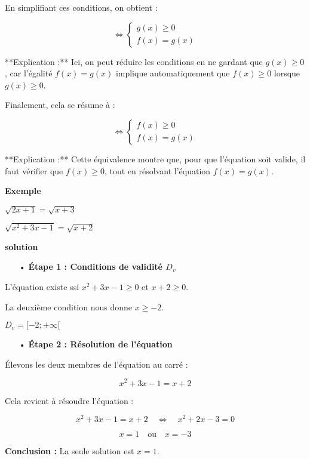 \documentclass[12pt]{article}
\begin{document}
En simplifiant ces conditions, on obtient :

\[
\Leftrightarrow \begin{cases}
g(x) \geq 0 \\
f(x) = g(x)
\end{cases}
\]

**Explication :** Ici, on peut réduire les conditions en ne gardant que \( g(x) \geq 0 \), car l'égalité \( f(x) = g(x) \) implique automatiquement que \( f(x) \geq 0 \) lorsque \( g(x) \geq 0 \).

Finalement, cela se résume à :

\[
\Leftrightarrow \begin{cases}
f(x) \geq 0 \\
f(x) = g(x)
\end{cases}
\]

**Explication :** Cette équivalence montre que, pour que l'équation soit valide, il faut vérifier que \( f(x) \geq 0 \), tout en résolvant l'équation \( f(x) = g(x) \).

 \textbf{Exemple} 
 
\( \sqrt{ 2x+1} = \sqrt{ x+3}  \)

\( \sqrt{ x^{2}+3x-1} = \sqrt{ x+2}  \)

 \textbf{solution} 

\begin{itemize}
    \item[•] \textbf{Étape 1 : Conditions de validité \( D_{v} \)}
\end{itemize}

L'équation existe ssi \( x^2 + 3x - 1 \geq 0 \) et \( x + 2 \geq 0 \). 

 La deuxième condition nous donne \( x \geq -2 \).

\( D_{v} =[-2; +\infty[ \)

\begin{itemize}
    \item[•] \textbf{Étape 2 : Résolution de l'équation}
\end{itemize}

Élevons les deux membres de l'équation au carré :

\[
x^2 + 3x - 1 = x + 2
\]

Cela revient à résoudre l'équation :

\[
x^2 + 3x - 1 = x + 2 \quad \Leftrightarrow \quad x^2 + 2x - 3 = 0
\]


\[
 x = 1 \quad \text{ou} \quad x = -3
\]

\textbf{Conclusion :} La seule solution est \( x = 1 \).
\end{document}

